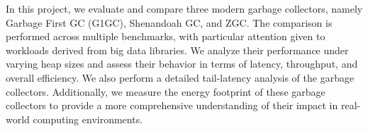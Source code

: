 In this project, we evaluate and compare three modern garbage collectors, namely Garbage First GC (G1GC), Shenandoah GC, and ZGC. The comparison is performed across multiple benchmarks, with particular attention given to workloads derived from big data libraries. We analyze their performance under varying heap sizes and assess their behavior in terms of latency, throughput, and overall efficiency. We also  perform a detailed tail-latency analysis of the garbage collectors. Additionally, we measure the energy footprint of these garbage collectors to provide a more comprehensive understanding of their impact in real-world computing environments.